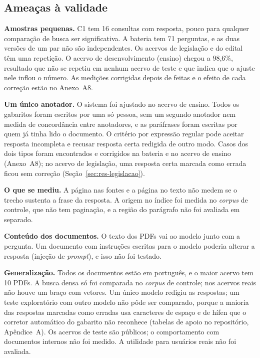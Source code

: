 \documentclass[12pt]{article}
\begin{document}
\subsection{Ameaças à validade}
\label{sec:ameacas}

\textbf{Amostras pequenas.} C1 tem 16 consultas com resposta, pouco para qualquer comparação de busca ser significativa. A bateria tem 71 perguntas, e as duas versões de um par não são independentes. Os acervos de legislação e do edital têm uma repetição. O acervo de desenvolvimento (ensino) chegou a 98,6\%, resultado que não se repetiu em nenhum acervo de teste e que indica que o ajuste nele inflou o número. As medições corrigidas depois de feitas e o efeito de cada correção estão no Anexo~A8.

\textbf{Um único anotador.} O sistema foi ajustado no acervo de ensino. Todos os gabaritos foram escritos por uma só pessoa, sem um segundo anotador nem medida de concordância entre anotadores, e as paráfrases foram escritas por quem já tinha lido o documento. O critério por expressão regular pode aceitar resposta incompleta e recusar resposta certa redigida de outro modo. Casos dos dois tipos foram encontrados e corrigidos na bateria e no acervo de ensino (Anexo~A8); no acervo de legislação, uma resposta certa marcada como errada ficou sem correção (Seção~\ref{sec:res-legislacao}).

\textbf{O que se mediu.} A página nas fontes e a página no texto não medem se o trecho sustenta a frase da resposta. A origem no índice foi medida no \emph{corpus} de controle, que não tem paginação, e a região do parágrafo não foi avaliada em separado.

\textbf{Conteúdo dos documentos.} O texto dos PDFs vai ao modelo junto com a pergunta. Um documento com instruções escritas para o modelo poderia alterar a resposta (injeção de \emph{prompt}), e isso não foi testado.

\textbf{Generalização.} Todos os documentos estão em português, e o maior acervo tem 10 PDFs. A busca densa só foi comparada no \emph{corpus} de controle; nos acervos reais não houve um braço com vetores. Um único modelo redigiu as respostas; um teste exploratório com outro modelo não pôde ser comparado, porque a maioria das respostas marcadas como erradas usa caracteres de espaço e de hífen que o corretor automático do gabarito não reconhece (tabelas de apoio no repositório, Apêndice~A). Os acervos de teste são públicos; o comportamento com documentos internos não foi medido. A utilidade para usuários reais não foi avaliada.
\end{document}
